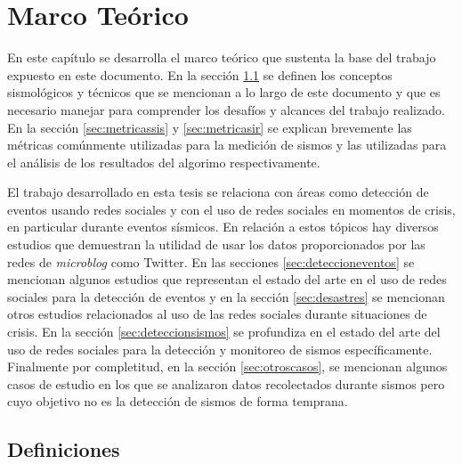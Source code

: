 \chapter{Marco Teórico}
\label{cap:marco}

En este capítulo se desarrolla el marco teórico que sustenta la base del trabajo expuesto en este documento. En la sección \ref{sec:glosario} se definen los conceptos sismológicos y técnicos que se mencionan a lo largo de este documento y que es necesario manejar para comprender los desafíos y alcances del trabajo realizado. En la sección \ref{sec:metricassis} y \ref{sec:metricasir} se explican brevemente las métricas comúnmente utilizadas para la medición de sismos y las utilizadas para el análisis de los resultados del algorimo respectivamente. 

El trabajo desarrollado en esta tesis se relaciona con áreas como detección de eventos usando redes sociales y con el uso de redes sociales en momentos de crisis, en particular durante eventos sísmicos. En relación a estos tópicos hay diversos estudios que demuestran la utilidad de usar los datos proporcionados por las redes de \textit{microblog} como Twitter. En las secciones \ref{sec:deteccioneventos} se mencionan algunos estudios que representan el estado del arte en el uso de redes sociales para la detección de eventos y en la sección \ref{sec:desastres} se mencionan otros estudios relacionados al uso de las redes sociales durante situaciones de crisis. 
En la sección \ref{sec:deteccionsismos} se profundiza en el estado del arte del uso de redes sociales para la detección y monitoreo de sismos específicamente. Finalmente por completitud, en la sección \ref{sec:otroscasos}, se mencionan algunos casos de estudio en los que se analizaron datos recolectados durante sismos pero cuyo objetivo no es la detección de sismos de forma temprana. 

\section{Definiciones}
\label{sec:glosario}


